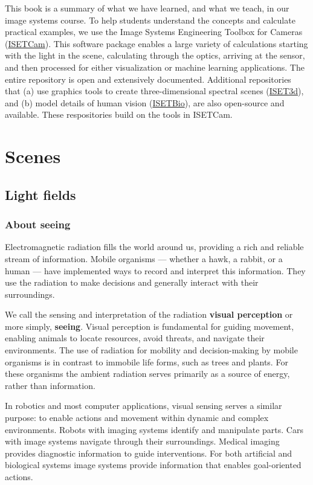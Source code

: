 \documentclass[
  letterpaper,
]{book}
\begin{document}
This book is a summary of what we have learned, and what we teach, in
our image systems course. To help students understand the concepts and
calculate practical examples, we use the Image Systems Engineering
Toolbox for Cameras
(\href{https://github.com/iset/isetcam/wiki}{ISETCam}). This software
package enables a large variety of calculations starting with the light
in the scene, calculating through the optics, arriving at the sensor,
and then processed for either visualization or machine learning
applications. The entire repository is open and extensively documented.
Additional repositories that (a) use graphics tools to create
three-dimensional spectral scenes
(\href{https://github.com/iset/iset3d-tiny/wiki}{ISET3d}), and (b) model
details of human vision
(\href{https://github.com/isetbio/isetbio/wiki}{ISETBio}), are also
open-source and available. These respositories build on the tools in
ISETCam.

\part{Scenes}

\chapter{Light fields}\label{sec-seeing}

\section{About seeing}\label{about-seeing}

Electromagnetic radiation fills the world around us, providing a rich
and reliable stream of information. Mobile organisms --- whether a hawk,
a rabbit, or a human --- have implemented ways to record and interpret
this information. They use the radiation to make decisions and generally
interact with their surroundings.

We call the sensing and interpretation of the radiation \textbf{visual
perception} or more simply, \textbf{seeing}. Visual perception is
fundamental for guiding movement, enabling animals to locate resources,
avoid threats, and navigate their environments. The use of radiation for
mobility and decision-making by mobile organisms is in contrast to
immobile life forms, such as trees and plants. For these organisms the
ambient radiation serves primarily as a source of energy, rather than
information.

In robotics and most computer applications, visual sensing serves a
similar purpose: to enable actions and movement within dynamic and
complex environments. Robots with imaging systems identify and
manipulate parts. Cars with image systems navigate through their
surroundings. Medical imaging provides diagnostic information to guide
interventions. For both artificial and biological systems image systems
provide information that enables goal-oriented actions.
\end{document}
